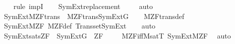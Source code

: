 \begin{isabellebody}
\ \ \ \isamarkupfalse%
{\isacharparenleft}{\kern0pt}rule\ impI{\isacharparenright}{\kern0pt}{\isacharplus}{\kern0pt}\isanewline
\ \ \isamarkupfalse%
\ SymExt{\isacharunderscore}{\kern0pt}replacement\ \isanewline
\ \ \isamarkupfalse%
\ auto%
\endisatagproof
{\isafoldproof}%
%
\isadelimproof
\isanewline
%
\endisadelimproof
\isanewline
{}\isamarkupfalse%
\ SymExt{\isacharunderscore}{\kern0pt}M{\isacharunderscore}{\kern0pt}ZF{\isacharunderscore}{\kern0pt}trans\ {\isacharcolon}{\kern0pt}\ {\isachardoublequoteopen}M{\isacharunderscore}{\kern0pt}ZF{\isacharunderscore}{\kern0pt}trans{\isacharparenleft}{\kern0pt}SymExt{\isacharparenleft}{\kern0pt}G{\isacharparenright}{\kern0pt}{\isacharparenright}{\kern0pt}{\isachardoublequoteclose}\isanewline
%
\isadelimproof
\ \ %
\endisadelimproof
%
\isatagproof
{}\isamarkupfalse%
\ M{\isacharunderscore}{\kern0pt}ZF{\isacharunderscore}{\kern0pt}trans{\isacharunderscore}{\kern0pt}def\ \isanewline
\ \ \isamarkupfalse%
\ SymExt{\isacharunderscore}{\kern0pt}M{\isacharunderscore}{\kern0pt}ZF\ M{\isacharunderscore}{\kern0pt}ZF{\isacharunderscore}{\kern0pt}def\ Transset{\isacharunderscore}{\kern0pt}SymExt\isanewline
\ \ \isamarkupfalse%
\ auto%
\endisatagproof
{\isafoldproof}%
%
\isadelimproof
\isanewline
%
\endisadelimproof
\isanewline
{}\isamarkupfalse%
\ SymExt{\isacharunderscore}{\kern0pt}sats{\isacharunderscore}{\kern0pt}ZF\ {\isacharcolon}{\kern0pt}\ {\isachardoublequoteopen}SymExt{\isacharparenleft}{\kern0pt}G{\isacharparenright}{\kern0pt}\ {\isasymTurnstile}\ ZF{\isachardoublequoteclose}\ \isanewline
%
\isadelimproof
\ \ %
\endisadelimproof
%
\isatagproof
{}\isamarkupfalse%
\ M{\isacharunderscore}{\kern0pt}ZF{\isacharunderscore}{\kern0pt}iff{\isacharunderscore}{\kern0pt}M{\isacharunderscore}{\kern0pt}satT\ SymExt{\isacharunderscore}{\kern0pt}M{\isacharunderscore}{\kern0pt}ZF\ \isamarkupfalse%
\ auto%
\endisatagproof
{\isafoldproof}%
%
\isadelimproof
\isanewline
%
\endisadelimproof
\isanewline
{}\isamarkupfalse%
\isanewline
%
\isadelimtheory
%
\endisadelimtheory
%
\isatagtheory
{}\isamarkupfalse%
%
\endisatagtheory
{\isafoldtheory}%
%
\isadelimtheory
%
\endisadelimtheory
%
\end{isabellebody}%
\endinput
